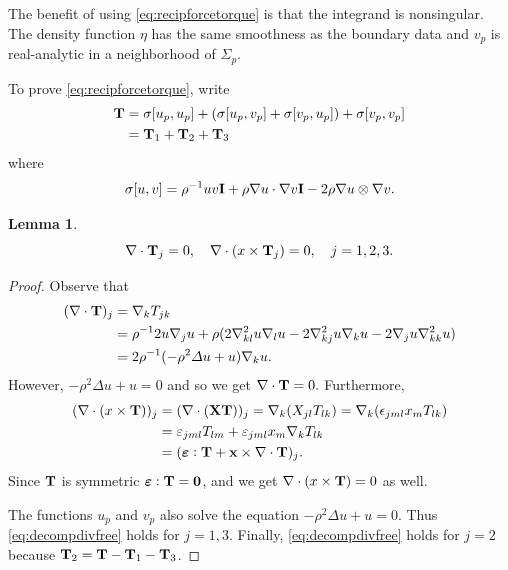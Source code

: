 \documentclass[lineno]{jfm}
\newtheorem{lemma}{Lemma}
\begin{document}
The benefit of using \eqref{eq:recipforcetorque} is that the integrand  is nonsingular.
The density function $\eta$ has the same smoothness as the boundary data
and $v_p$ is real-analytic in a neighborhood of $\Sigma_p$.

To prove \eqref{eq:recipforcetorque}, write
\begin{align*}
  {\bf T}
  &=
  \sigma[u_p,u_p]
  +(\sigma[u_p,v_p]
  +\sigma[v_p,u_p])
  +\sigma[v_p,v_p] \\
  &= {\bf T}_1 + {\bf T}_2 + {\bf T}_3
\end{align*}
where
\[
\sigma[u,v]
= \rho^{-1} uv {\bf I} + \rho \nabla u \cdot \nabla v {\bf I} - 2 \rho \nabla u \otimes \nabla v.
\]
\begin{lemma}
  \label{eq:stress_div_lemma}
  \begin{equation}
    \label{eq:decompdivfree}
    \nabla \cdot {\bf T}_j = 0, \quad
    \nabla \cdot (x \times {\bf T}_j) = 0,\quad j = 1, 2, 3.
  \end{equation}
\end{lemma}
\begin{proof}
  Observe that
  \begin{align*}
    (\nabla \cdot {\bf T})_j &=
    \nabla_k   T_{jk} \\
    &= \rho^{-1} 2u \nabla_j u + \rho(2\nabla_{kl}^2 u \nabla_l u  - 2 \nabla_{kj}^2 u \nabla_k u
    - 2 \nabla_j u \nabla_{kk}^2 u )\\
    &=2\rho^{-1}(-\rho^2 \Delta u + u)\nabla_k u .
  \end{align*}
  However, $-\rho^2 \Delta u + u = 0$ and so we get $\nabla \cdot {\bf T} = 0.$
  Furthermore,
  \begin{align*}
    (\nabla \cdot (x\times {\bf T} ))_j
    &= (\nabla \cdot ({\bf X} {\bf T} ))_j
    = \nabla_k (X_{jl} T_{lk})
    = \nabla_k (\epsilon_{jml}x_m T_{lk})\\
    &= \varepsilon_{jml} T_{lm} + \varepsilon_{jml}x_m \nabla_k T_{lk}\\
    &= (\boldsymbol{\varepsilon}:{\bf T} + {\bf x} \times \nabla \cdot {\bf T})_j.
  \end{align*}
  Since ${\bf T}$ is symmetric $\boldsymbol{\varepsilon}:{\bf T} = {\bf 0}$, and we get
  $\nabla \cdot (x \times {\bf T}) = 0$ as well.

  The functions $u_p$ and $v_p$ also solve the equation $-\rho^2 \Delta u + u = 0$.  Thus
  \eqref{eq:decompdivfree} holds for $j = 1, 3$. Finally,
  \eqref{eq:decompdivfree} holds for $j = 2$ because
  ${\bf T}_2 = {\bf T} - {\bf T}_1 - {\bf T}_3$.
\end{proof}
\end{document}

